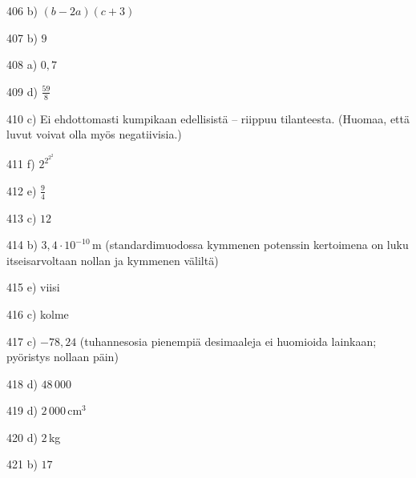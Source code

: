 \begin{Vastaus}{406}
	b) $(b-2a)(c+3)$
    
\end{Vastaus}
\begin{Vastaus}{407}
	 b) $9$
    
\end{Vastaus}
\begin{Vastaus}{408}
	 a) $0,7$
    
\end{Vastaus}
\begin{Vastaus}{409}
	 d) $\frac{59}{8}$
    
\end{Vastaus}
\begin{Vastaus}{410}
	 c) Ei ehdottomasti kumpikaan edellisistä -- riippuu tilanteesta. (Huomaa, että luvut voivat olla myös negatiivisia.)
    
\end{Vastaus}
\begin{Vastaus}{411}
	 f) $2^{2^{2^2}}$
	
\end{Vastaus}
\begin{Vastaus}{412}
e) $\frac{9}{4}$
\end{Vastaus}
\begin{Vastaus}{413}
c) $12$
\end{Vastaus}
\begin{Vastaus}{414}
b) $3,4 \cdot 10^{-10}$\,m (standardimuodossa kymmenen potenssin kertoimena on luku itseisarvoltaan nollan ja kymmenen väliltä)
\end{Vastaus}
\begin{Vastaus}{415}
e) viisi
\end{Vastaus}
\begin{Vastaus}{416}
c) kolme
\end{Vastaus}
\begin{Vastaus}{417}
c) $-78,24$ (tuhannesosia pienempiä desimaaleja ei huomioida lainkaan; pyöristys nollaan päin)
\end{Vastaus}
\begin{Vastaus}{418}
d) $48\,000$
\end{Vastaus}
\begin{Vastaus}{419}
	d) $2\,000$\,cm$^3$
	
\end{Vastaus}
\begin{Vastaus}{420}
	d) $2$\,kg
	
\end{Vastaus}
\begin{Vastaus}{421}
	b) $17$
	
\end{Vastaus}
